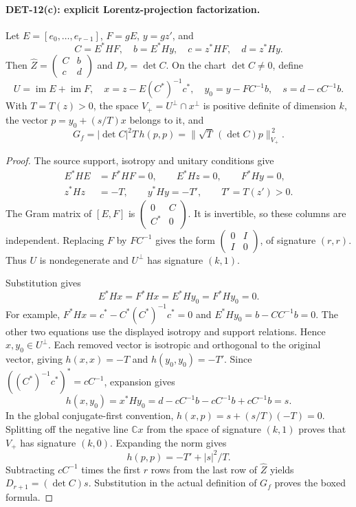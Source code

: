 \documentclass[11pt,a4paper]{article}
\newcommand{\C}{\mathbb C}
\begin{document}
\paragraph{DET-12(c): explicit Lorentz-projection factorization.}
Let \(E=[e_0,\ldots,e_{r-1}]\), \(F=gE\), \(y=gz'\), and
\[
 C=E^*HF,\quad b=E^*Hy,\quad c=z^*HF,\quad d=z^*Hy.
\]
Then \(\widehat Z=\left(\begin{smallmatrix}C&b\\c&d\end{smallmatrix}\right)\)
and \(D_r=\det C\). On the chart \(\det C\ne0\), define
\[
 U=\operatorname{im}E+\operatorname{im}F,\quad
 x=z-E(C^*)^{-1}c^*,\quad y_0=y-FC^{-1}b,\quad
 s=d-cC^{-1}b.
\]
With \(T=T(z)>0\), the space
\(V_+=U^\perp\cap x^\perp\) is positive definite of dimension \(k\),
the vector \(p=y_0+(s/T)x\) belongs to it, and
\[
 \boxed{\quad G_f=|\det C|^2T\,h(p,p)
 =\bigl\|\sqrt T\,(\det C)p\bigr\|_{V_+}^{\,2}.\quad}
\]
\begin{proof}
The source support, isotropy and unitary conditions give
\begin{align*}
 E^*HE&=F^*HF=0,\qquad E^*Hz=0,\qquad F^*Hy=0,\\
 z^*Hz&=-T,\qquad y^*Hy=-T',\qquad T'=T(z')>0.
\end{align*}
The Gram matrix of \([E,F]\) is
\(\left(\begin{smallmatrix}0&C\\C^*&0\end{smallmatrix}\right)\).
It is invertible, so these columns are independent.
Replacing \(F\) by \(FC^{-1}\) gives the form
\(\left(\begin{smallmatrix}0&I\\I&0\end{smallmatrix}\right)\),
of signature \((r,r)\). Thus \(U\) is nondegenerate and \(U^\perp\)
has signature \((k,1)\).

Substitution gives
\[
 E^*Hx=F^*Hx=E^*Hy_0=F^*Hy_0=0.
\]
For example,
\(F^*Hx=c^*-C^*(C^*)^{-1}c^*=0\) and
\(E^*Hy_0=b-CC^{-1}b=0\).
The other two equations use the displayed isotropy and support
relations. Hence \(x,y_0\in U^\perp\).
Each removed vector is isotropic and orthogonal to the original
vector, giving \(h(x,x)=-T\) and \(h(y_0,y_0)=-T'\).
Since \(((C^*)^{-1}c^*)^*=cC^{-1}\), expansion gives
\[
 h(x,y_0)=x^*Hy_0
 =d-cC^{-1}b-cC^{-1}b+cC^{-1}b=s.
\]
In the global conjugate-first convention,
\(h(x,p)=s+(s/T)(-T)=0\). Splitting off the negative line
\(\mathbb Cx\) from the space of signature \((k,1)\) proves that
\(V_+\) has signature \((k,0)\). Expanding the norm gives
\[
 h(p,p)=-T'+|s|^2/T.
\]
Subtracting \(cC^{-1}\) times the first \(r\) rows from the last
row of \(\widehat Z\) yields
\(D_{r+1}=(\det C)s\). Substitution in the actual definition of
\(G_f\) proves the boxed formula.
\end{proof}
\end{document}
